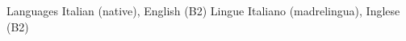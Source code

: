 \begin{cvskills}    
\ifenglish
\cvskill
    {Languages} %
    {Italian (native), English (B2)}
\else
\cvskill
    {Lingue} %
    {Italiano (madrelingua), Inglese (B2)}
\fi
\end{cvskills}




